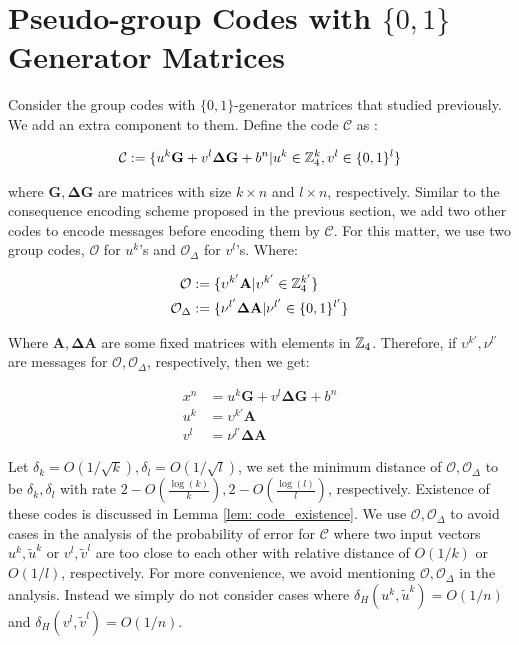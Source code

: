 \section{Pseudo-group Codes with $\{0,1\}$ Generator Matrices}\label{sec: adding ext comp}

Consider the group codes with $\{0,1 \}$-generator matrices that studied previously. We add an extra component to them. Define the code $\mathcal{C}$ as :

\begin{align*}
\mathcal{C}:=\{ u^k\mathbf{G}+v^l \mathbf{\Delta G} +b^n| u^k \in \mathbb{Z}_4^k, v^l\in \{ 0,1\}^l\}
\end{align*} 

where $\mathbf{G}, \mathbf{\Delta G}$ are matrices with size $k\times n$ and $l \times n$, respectively. Similar to the consequence encoding scheme proposed in the previous section, we add two other codes to encode messages before encoding them by $\mathcal{C}$. For this matter, we use  two group codes, $\mathcal{O}$ for $u^k$'s and $\mathcal{O}_\Delta$ for $v^l$'s. Where:

\begin{align*}
\mathcal{O} &:=\{\upsilon^{k'}\mathbf{A} | \upsilon^{k'} \in \mathbb{Z}_4^{k'} \}\\
\mathcal{O}_\Delta &:=\{\nu^{l'}\mathbf{\Delta A} | \nu^{l'} \in \{0, 1\}^{l'} \}\\
\end{align*}

Where $\mathbf{A}, \mathbf{\Delta A}$ are some fixed matrices with elements in $\mathbb{Z}_4$. Therefore, if $\upsilon^{k'}, \nu^{l'}$ are messages for $\mathcal{O}, \mathcal{O}_\Delta$, respectively, then we get:


\begin{align*}
x^n&=u^k\mathbf{G}+v^l \mathbf{\Delta G} +b^n\\
u^k&=\upsilon^{k'}\mathbf{A}\\
v^l&=\nu^{l'}\mathbf{\Delta A}
\end{align*}


Let $\delta_k = O(1/\sqrt{k}), \delta_l = O(1/\sqrt{l})$, we set the minimum distance of $\mathcal{O}, \mathcal{O}_\Delta$ to be $\delta_k, \delta_l$  with rate $2-O(\frac{\log(k)}{k}), 2-O(\frac{\log(l)}{l})$, respectively. Existence of these codes is discussed in Lemma \ref{lem: code_existence}. We use $\mathcal{O}, \mathcal{O}_\Delta$ to avoid cases in the analysis of the probability of error for $\mathcal{C}$ where two input vectors $u^k, \tilde{u}^k$ or $v^l, \tilde{v}^l$ are too close to each other with relative distance of $O(1/k)$ or $O(1/l)$, respectively. For more convenience, we avoid mentioning $\mathcal{O}, \mathcal{O}_\Delta$ in the analysis. Instead we simply do not consider cases where $\delta_H(u^k,\tilde{u}^k)=O(1/n)$ and $\delta_H(v^l,\tilde{v}^l)=O(1/n)$.

